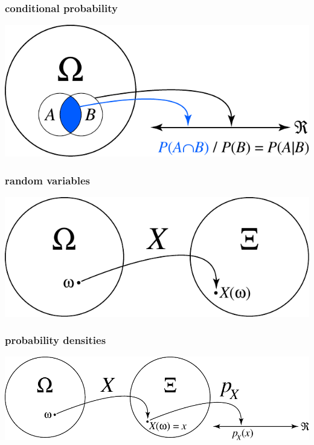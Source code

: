 \begin{frame}
\frametitle{conditional probability}
\begin{center}	
			\includegraphics[scale=0.45]{fig/condprob10.pdf}
	\end{center}		
\end{frame}

\begin{frame}
\frametitle{random variables}
\begin{center}	
			\includegraphics[scale=0.45]{fig/randvar15.pdf}
	\end{center}		
\end{frame}

\begin{frame}
\frametitle{probability densities}
\begin{center}	
			\includegraphics[scale=0.45]{fig/probdensity17.pdf}
	\end{center}		
\end{frame}

